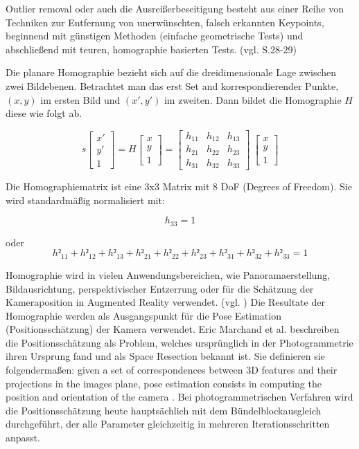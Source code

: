 \glqq Outlier removal\grqq{} oder auch die Ausreißerbeseitigung besteht aus einer Reihe von Techniken zur Entfernung von unerwünschten, falsch erkannten Keypoints, beginnend mit günstigen Methoden (einfache geometrische Tests) und abschließend mit teuren, homographie basierten Tests. (vgl. \cite{natural_feature} S.28-29) 


Die planare Homographie bezieht sich auf die dreidimensionale Lage zwischen zwei Bildebenen. Betrachtet man das erst Set and korrespondierender Punkte, $(x,y)$ im ersten Bild und $(x',y')$ im zweiten. Dann bildet die Homographie $H$ diese wie folgt ab.

\begin{equation}
  s  
  		\begin{bmatrix}
		x'\\
		y'\\
		1
     	\end{bmatrix}
     = H
     	\begin{bmatrix}
		x\\
		y\\
		1
     	\end{bmatrix}
      = 
     	\begin{bmatrix}
		h_{11} & h_{12} & h_{13}\\
		h_{21} & h_{22} & h_{23}\\
		h_{31} & h_{32} & h_{33}
     	\end{bmatrix}
      \
     	\begin{bmatrix}
		x\\
		y\\
		1
     	\end{bmatrix}
\end{equation}

Die Homographiematrix ist eine 3x3 Matrix mit 8 DoF (Degrees of Freedom). Sie wird standardmäßig normalisiert mit: 

\begin{equation}
h_33 = 1
\end{equation}

oder 
\begin{equation}
h²_{11} + h²_{12} + h²_{13} + h²_{21} + h²_{22} + h²_{23} + h²_{31} + h²_{32} + h²_{33} = 1
\end{equation}

Homographie wird in vielen Anwendungsbereichen, wie Panoramaerstellung, Bildausrichtung, perspektivischer Entzerrung oder für die Schätzung der Kameraposition in Augmented Reality verwendet. (vgl. \cite{homography}) Die Resultate der Homographie werden als Ausgangspunkt für die \glqq Pose Estimation\grqq{} (Positionsschätzung) der Kamera verwendet.  Eric Marchand et al. \cite{natural_feature} beschreiben die Positionsschätzung als Problem, welches ursprünglich in der Photogrammetrie ihren Ursprung fand und als \glqq Space Resection\grqq{} bekannt ist. Sie definieren sie folgendermaßen: \glqq given a set of correspondences between 3D features and their projections in the images plane, pose estimation consists in computing the position and orientation of the camera \grqq{}. Bei photogrammetrischen Verfahren wird die Positionsschätzung heute hauptsächlich mit dem Bündelblockausgleich durchgeführt, der alle Parameter gleichzeitig in mehreren Iterationsschritten anpasst.


